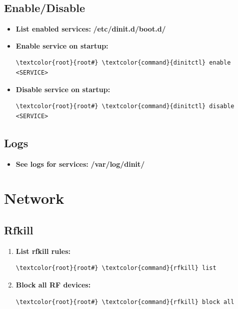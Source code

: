 \documentclass[10pt, a4paper, onecolumn, oneside, titlepage, openany]{book}
\begin{document}
\section{Enable/Disable}
\begin{itemize}
    \item \textbf{List enabled services:}
\newline \textbf{\textcolor{dir}{/etc/dinit.d/boot.d/}}
    \item \textbf{Enable service on startup:}
\begin{Verbatim}[commandchars=\\\{\}]
\textcolor{root}{root#} \textcolor{command}{dinitctl} enable <SERVICE>
\end{Verbatim}
    \item \textbf{Disable service on startup:}
\begin{Verbatim}[commandchars=\\\{\}]
\textcolor{root}{root#} \textcolor{command}{dinitctl} disable <SERVICE>
\end{Verbatim}
\end{itemize}

\section{Logs}
\begin{itemize}
    \item \textbf{See logs for services:}
\newline \textbf{\textcolor{dir}{/var/log/dinit/}}    
\end{itemize}


\chapter{Network}
\label{network}
\section{Rfkill}
\begin{enumerate}
    \item \textbf{List rfkill rules:}
\begin{Verbatim}[commandchars=\\\{\}]
\textcolor{root}{root#} \textcolor{command}{rfkill} list
\end{Verbatim}    
    \item \textbf{Block all RF devices:}
\begin{Verbatim}[commandchars=\\\{\}]
\textcolor{root}{root#} \textcolor{command}{rfkill} block all
\end{Verbatim}
\end{enumerate}
\end{document}

